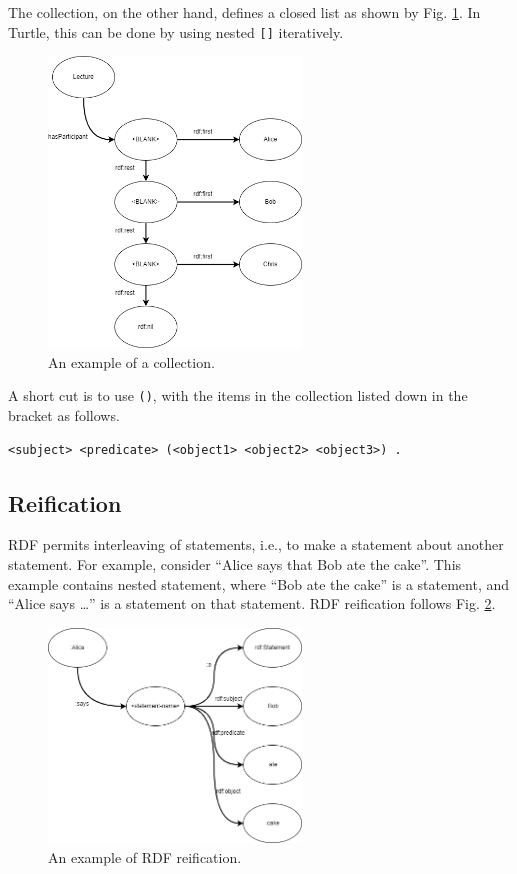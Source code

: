 The collection, on the other hand, defines a closed list as shown by Fig. \ref{fig:lectureexp4}. In Turtle, this can be done by using nested \verb|[]| iteratively.
\begin{figure}[!htb]
	\centering
	\includegraphics[width=0.6\textwidth]{chapters/part-4/figures/lectureexp4.png}
	\caption{An example of a collection.}
	\label{fig:lectureexp4}
\end{figure}
A short cut is to use \verb|()|, with the items in the collection listed down in the bracket as follows.
\begin{lstlisting}
<subject> <predicate> (<object1> <object2> <object3>) .
\end{lstlisting}

\subsection{Reification}

RDF permits interleaving of statements, i.e., to make a statement about another statement. For example, consider ``Alice says that Bob ate the cake''. This example contains nested statement, where ``Bob ate the cake'' is a statement, and ``Alice says \ldots'' is a statement on that statement. RDF reification follows Fig. \ref{fig:reificationexp}.
\begin{figure}[!htb]
	\centering
	\includegraphics[width=0.6\textwidth]{chapters/part-4/figures/reificationexp.png}
	\caption{An example of RDF reification.}
	\label{fig:reificationexp}
\end{figure}

